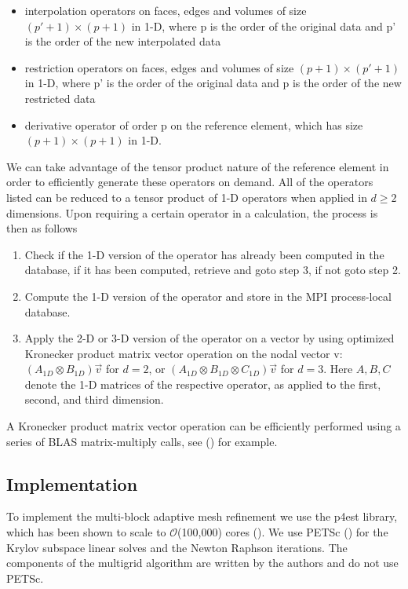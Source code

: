 \begin{itemize}
\item interpolation operators on faces, edges and volumes of size $(p'+1) \times (p+1)$ in 1-D, where p is the order of the original data and p' is the order of the new interpolated data
\item restriction operators on faces, edges and volumes of size $(p+1) \times (p'+1)$ in 1-D, where p' is the order of the original data and p is the order of the new restricted data
\item derivative operator of order p on the reference element, which has size $(p+1) \times (p+1)$ in 1-D.
\end{itemize}

We can take advantage of the tensor product nature of the reference element in order to efficiently generate these operators on demand. All of the operators
listed can be reduced to a tensor product of 1-D operators when applied in $d\ge 2$ dimensions. Upon requiring a certain operator in a calculation, the process is then as follows

\begin{enumerate}
\item Check if the 1-D version of the operator has already been computed in the database, if it has been computed, retrieve and goto step 3, if not goto step 2.
\item Compute the 1-D version of the operator and store in the MPI process-local database.
\item Apply the 2-D or 3-D version of the operator on a vector by using optimized Kronecker product matrix vector operation on the nodal vector v: $(A_{1D} \otimes B_{1D})\vec{v}$ for $d=2$, or $(A_{1D} \otimes B_{1D} \otimes C_{1D})\vec{v}$ for $d=3$. Here $A,B, C$ denote the 1-D matrices of the respective operator, as applied to the first, second, and third dimension.
\end{enumerate}

A Kronecker product matrix vector operation can be efficiently performed using a series of BLAS matrix-multiply calls, see (\citet*{buis1996efficient}) for example.

\subsection{Implementation}

To implement the multi-block adaptive mesh refinement we use the p4est library, which has been shown to scale to $\mathcal{O}$(100,000) cores (\citet*{burstedde2011p4est}). We use PETSc (\citet*{petsc_home_page}) for the Krylov subspace linear solves and the Newton Raphson iterations. The components of the multigrid algorithm are written by the authors and do not use PETSc.

